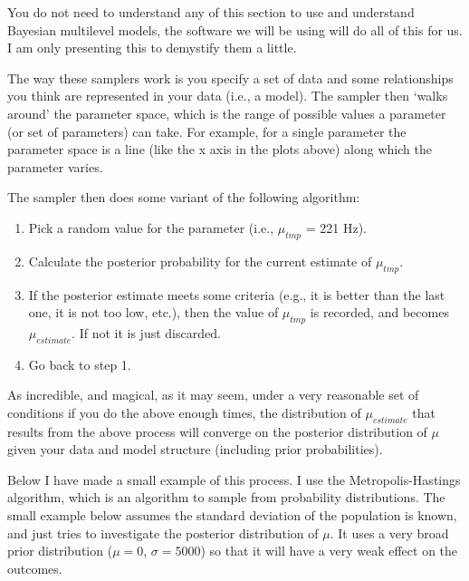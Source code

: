 \documentclass[
]{book}
\begin{document}
You do not need to understand any of this section to use and understand Bayesian multilevel models, the software we will be using will do all of this for us. I am only presenting this to demystify them a little.

The way these samplers work is you specify a set of data and some relationships you think are represented in your data (i.e., a model). The sampler then `walks around' the parameter space, which is the range of possible values a parameter (or set of parameters) can take. For example, for a single parameter the parameter space is a line (like the x axis in the plots above) along which the parameter varies.

The sampler then does some variant of the following algorithm:

\begin{enumerate}
\def\labelenumi{\arabic{enumi})}
\item
  Pick a random value for the parameter (i.e., \(\mu_{tmp}\) = 221 Hz).
\item
  Calculate the posterior probability for the current estimate of \(\mu_{tmp}\).
\item
  If the posterior estimate meets some criteria (e.g., it is better than the last one, it is not too low, etc.), then the value of \(\mu_{tmp}\) is recorded, and becomes \(\mu_{estimate}\). If not it is just discarded.
\item
  Go back to step 1.
\end{enumerate}

As incredible, and magical, as it may seem, under a very reasonable set of conditions if you do the above enough times, the distribution of \(\mu_{estimate}\) that results from the above process will converge on the posterior distribution of \(\mu\) given your data and model structure (including prior probabilities).

Below I have made a small example of this process. I use the Metropolis-Hastings algorithm, which is an algorithm to sample from probability distributions. The small example below assumes the standard deviation of the population is known, and just tries to investigate the posterior distribution of \(\mu\). It uses a very broad prior distribution (\(\mu = 0\), \(\sigma = 5000\)) so that it will have a very weak effect on the outcomes.
\end{document}
